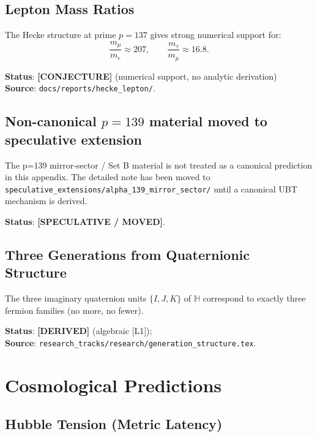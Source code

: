 \documentclass[11pt,a4paper]{article}
\theoremstyle{definition}
\theoremstyle{remark}
\begin{document}
\subsection{Lepton Mass Ratios}

The Hecke structure at prime $p = 137$ gives strong numerical support for:
\begin{equation}
  \frac{m_\mu}{m_e} \approx 207,
  \qquad
  \frac{m_\tau}{m_\mu} \approx 16.8.
\end{equation}

\noindent\textbf{Status}: \textbf{[CONJECTURE]} (numerical support, no analytic derivation) \\
\noindent\textbf{Source}: \texttt{docs/reports/hecke\_lepton/}.

\subsection{Non-canonical $p=139$ material moved to speculative extension}

The p=139 mirror-sector / Set B material is not treated as a canonical
prediction in this appendix.  The detailed note has been moved to
\texttt{speculative\_extensions/alpha\_139\_mirror\_sector/} until a
canonical UBT mechanism is derived.

\noindent\textbf{Status}: \textbf{[SPECULATIVE / MOVED]}.

\subsection{Three Generations from Quaternionic Structure}

The three imaginary quaternion units $\{I,J,K\}$ of $\mathbb{H}$ correspond to
exactly three fermion families (no more, no fewer).

\noindent\textbf{Status}: \textbf{[DERIVED]} (algebraic [L1]); \\
\noindent\textbf{Source}: \texttt{research\_tracks/research/generation\_structure.tex}.

\section{Cosmological Predictions}\label{sec:cosmo}

\subsection{Hubble Tension (Metric Latency)}
\end{document}
